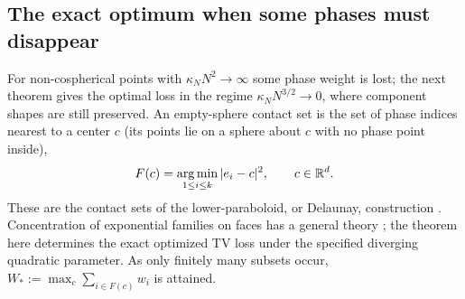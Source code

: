 \subsection{The exact optimum when some phases must disappear}

For non-cospherical points with $\kappa_NN^2\to\infty$ some phase
weight is lost; the next theorem gives the optimal loss in the regime
$\kappa_NN^{3/2}\to0$, where component shapes are still preserved.
An empty-sphere contact set is the set of phase indices nearest to a
center $c$ (its points lie on a sphere about $c$ with no phase point
inside),
\begin{equation}
 F(c)=\operatorname*{arg\,min}_{1\le i\le k}|e_i-c|^2,
 \qquad c\in\mathbb R^d.
 \label{eq:empty-sphere-contact}
\end{equation}
These are the contact sets of the lower-paraboloid, or Delaunay,
construction \cite{EdelsbrunnerSeidel1986}. Concentration
of exponential families on faces has a general
theory \cite{CsiszarMatus2005}; the theorem here determines the exact
optimized TV loss under the specified diverging quadratic parameter. As only finitely many subsets occur,
$W_*:=\max_c\sum_{i\in F(c)}w_i$ is attained.

